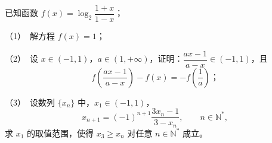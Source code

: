 \begin{question}
已知函数 $f(x)=\log_2\dfrac{1+x}{1-x}$；

（1）　解方程 $f(x)=1$；

（2）　设 $x\in(-1,1)$，$a\in(1,+\infty)$，证明：$\dfrac{ax-1}{a-x}\in(-1,1)$，且
\nopagebreak[4]
\[
f\left(\frac{ax-1}{a-x}\right)-f(x)=-f\left(\frac1a\right)\text{；}
\]

（3）　设数列 $\{x_n\}$ 中，$x_1\in(-1,1)$，
\nopagebreak[4]
\[
x_{n+1}=(-1)^{n+1}\frac{3x_n-1}{3-x_n},\qquad n\in\mathbb N^*,
\]
求 $x_1$ 的取值范围，使得 $x_3\ge x_n$ 对任意 $n\in\mathbb N^*$ 成立。

\end{question}